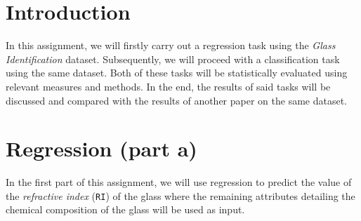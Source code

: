 \section{Introduction}
In this assignment, we will firstly carry out a regression task using the \textit{Glass Identification} dataset. Subsequently, we will proceed with a classification task using the same dataset. Both of these tasks will be statistically evaluated using relevant measures and methods. In the end, the results of said tasks will be discussed and compared with the results of another paper on the same dataset. 

\section{Regression (part a)}

In the first part of this assignment, we will use regression to predict the value of the \textit{refractive index} (\texttt{RI}) of the glass where the remaining attributes detailing the chemical composition of the glass will be used as input. \\ 

